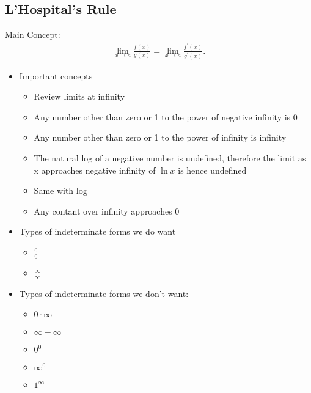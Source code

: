 \documentclass{report}
\begin{document}
    \subsection{ L'Hospital's Rule}
    \bigbreak \noindent 
    Main Concept:
    \begin{align*}
      \lim_{x \to a}{\frac{f(x)}{g(x)}} = \lim_{x \to a}{\frac{f^{\prime}(x)}{g^{\prime}(x)}}
    .\end{align*}
    \begin{itemize}
      \item Important concepts
        \begin{itemize}
          \item Review limits at infinity
          \item Any number other than zero or 1 to the power of negative infinity is 0
          \item Any number other than zero or 1 to the power of infinity is infinity
          \item The natural log of a negative number is undefined, therefore the limit as x approaches negative infinity of $\ln{x}$ is hence undefined
          \item Same with log
          \item Any contant over infinity approaches 0
        \end{itemize}
    \end{itemize}
    \begin{itemize}
      \item Types of indeterminate forms we do want
        \begin{itemize}
          \item $\frac{0}{0} $
          \item $\frac{\infty}{\infty} $
        \end{itemize}
    \end{itemize}
    \begin{itemize}
      \item Types of indeterminate forms we don't want:
        \begin{itemize}
          \item $0 \cdot \infty$
          \item $\infty - \infty $
          \item $0^{0} $
          \item $\infty^0 $
          \item $1^{\infty} $
        \end{itemize}
    \end{itemize}
\end{document}
